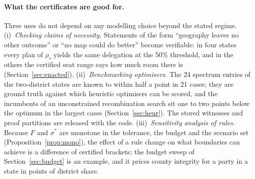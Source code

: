 \paragraph{What the certificates are good for.}
Three uses do not depend on any modelling choice beyond the stated regime. (i)~\emph{Checking claims of necessity.} Statements of the form ``geography leaves no other outcome'' or ``no map could do better'' become verifiable: in four states every plan of $\rho_s$ yields the same delegation at the 50\% threshold, and in the others the certified seat range says how much room there is (Section~\ref{sec:enacted}). (ii)~\emph{Benchmarking optimisers.} The 24 spectrum entries of the two-district states are known to within half a point in 21 cases; they are ground truth against which heuristic optimisers can be scored, and the incumbents of an unconstrained recombination search sit one to two points below the optimum in the largest cases (Section~\ref{sec:heur}). The stored witnesses and proof partitions are released with the code. (iii)~\emph{Sensitivity analysis of rules.} Because $F$ and $\sigma^*$ are monotone in the tolerance, the budget and the scenario set (Proposition~\ref{prop:mono}), the effect of a rule change on what boundaries can achieve is a difference of certified brackets; the budget sweep of Section~\ref{sec:budget} is an example, and it prices county integrity for a party in a state in points of district share.

